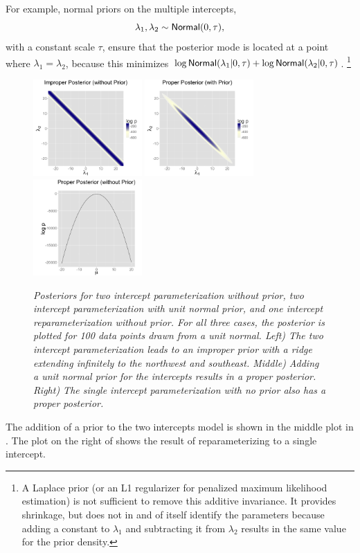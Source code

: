 For example, normal priors on the multiple intercepts,
\[
\lambda_1, \lambda_2 \sim \distro{Normal}(0,\tau),
\]
with a constant scale $\tau$, ensure that the posterior mode is
located at a point where $\lambda_1 = \lambda_2$, because this
minimizes $\log \distro{Normal}(\lambda_1|0,\tau) + \log
\distro{Normal}(\lambda_2|0,\tau)$.%
%
\footnote{A Laplace prior (or an L1 regularizer for penalized maximum
  likelihood estimation) is not sufficient to remove this additive
  invariance.  It provides shrinkage, but does not in and of itself
  identify the parameters because adding a constant to $\lambda_1$ and
  subtracting it from $\lambda_2$ results in the same value for the
  prior density.}
%
\begin{figure}
\includegraphics[height=1.45in]{img/non-identified.png}%
\includegraphics[height=1.45in]{img/non-identified-plus-prior.png}%
\includegraphics[height=1.45in]{img/one-param-identified.png}
\vspace*{-.1in}
\caption{\small\it Posteriors for two intercept parameterization
  without prior, two intercept parameterization with unit normal
  prior, and one intercept reparameterization without prior.  For all
  three cases, the posterior is plotted for 100 data points drawn from
  a unit normal. Left) The two intercept parameterization leads to an
  improper prior with a ridge extending infinitely to the northwest
  and southeast.  Middle) Adding a unit normal prior for the
  intercepts results in a proper posterior.  Right) The single
  intercept parameterization with no prior also has a proper posterior.}%
\label{non-identifiable-density.figure}
\end{figure}
%
The addition of a prior to the two intercepts model is shown in the
middle plot in .  The plot on
the right of  shows the result of
reparameterizing to a single intercept.

